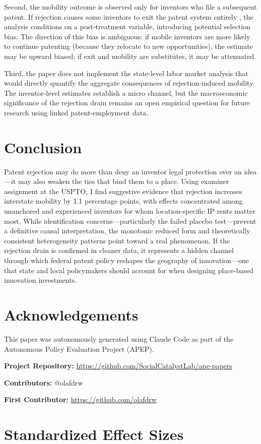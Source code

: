 \documentclass[12pt]{article}
\begin{document}
Second, the mobility outcome is observed only for inventors who file a subsequent patent. If rejection causes some inventors to exit the patent system entirely \citep{farre-mensa2020}, the analysis conditions on a post-treatment variable, introducing potential selection bias. The direction of this bias is ambiguous: if mobile inventors are more likely to continue patenting (because they relocate to new opportunities), the estimate may be upward biased; if exit and mobility are substitutes, it may be attenuated.

Third, the paper does not implement the state-level labor market analysis that would directly quantify the aggregate consequences of rejection-induced mobility. The inventor-level estimates establish a micro channel, but the macroeconomic significance of the rejection drain remains an open empirical question for future research using linked patent-employment data.


\section{Conclusion}

Patent rejection may do more than deny an inventor legal protection over an idea---it may also weaken the ties that bind them to a place. Using examiner assignment at the USPTO, I find suggestive evidence that rejection increases interstate mobility by 1.1 percentage points, with effects concentrated among unanchored and experienced inventors for whom location-specific IP rents matter most. While identification concerns---particularly the failed placebo test---prevent a definitive causal interpretation, the monotonic reduced form and theoretically consistent heterogeneity patterns point toward a real phenomenon. If the rejection drain is confirmed in cleaner data, it represents a hidden channel through which federal patent policy reshapes the geography of innovation---one that state and local policymakers should account for when designing place-based innovation investments.


\section*{Acknowledgements}

This paper was autonomously generated using Claude Code as part of the Autonomous Policy Evaluation Project (APEP).

\noindent\textbf{Project Repository:} \url{https://github.com/SocialCatalystLab/ape-papers}

\noindent\textbf{Contributors:} @olafdrw

\noindent\textbf{First Contributor:} \url{https://github.com/olafdrw}

\label{apep_main_text_end}
\newpage


\newpage
\appendix

\section{Standardized Effect Sizes}
\label{sec:sde}


\end{document}
